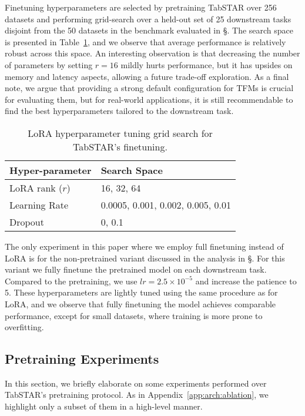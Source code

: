 Finetuning hyperparameters are selected by pretraining TabSTAR over 256 datasets and performing grid-search over a held-out set of 25 downstream tasks disjoint from the 50 datasets in the benchmark evaluated in \S{}. The search space is presented in Table~\ref{tab:lora_hyperparam_grid}, and we observe that average performance is relatively robust across this space. An interesting observation is that decreasing the number of parameters by setting $r=16$ mildly hurts performance, but it has upsides on memory and latency aspects, allowing a future trade-off exploration. As a final note, we argue that providing a strong default configuration for TFMs is crucial for evaluating them, but for real-world applications, it is still recommendable to find the best hyperparameters tailored to the downstream task. 

\begin{table}[h]
\centering
\caption{LoRA hyperparameter tuning grid search for TabSTAR's finetuning.}

\begin{tabular}{ll}
\toprule
\textbf{Hyper-parameter} & \textbf{Search Space} \\
\midrule
LoRA rank ($r$)            & 16, 32, 64     \\
Learning Rate              & 0.0005, 0.001, 0.002, 0.005, 0.01 \\
Dropout                     & 0, 0.1     \\
\bottomrule
\end{tabular}
\label{tab:lora_hyperparam_grid}
\end{table}

The only experiment in this paper where we employ full finetuning instead of LoRA is for the non-pretrained variant discussed in the analysis in \S{}. For this variant we fully finetune the pretrained model on each downstream task. Compared to the pretraining, we use $lr=2.5 \times 10^{-5}$ and increase the patience to 5. These hyperparameters are lightly tuned using the same procedure as for LoRA, and we observe that fully finetuning the model achieves comparable performance, except for small datasets, where training is more prone to overfitting.

\subsection{Pretraining Experiments}
\label{app:arch_exp}

In this section, we briefly elaborate on some experiments performed over TabSTAR's pretraining protocol. As in Appendix~\ref{app:arch:ablation}, we highlight only a subset of them in a high-level manner.

